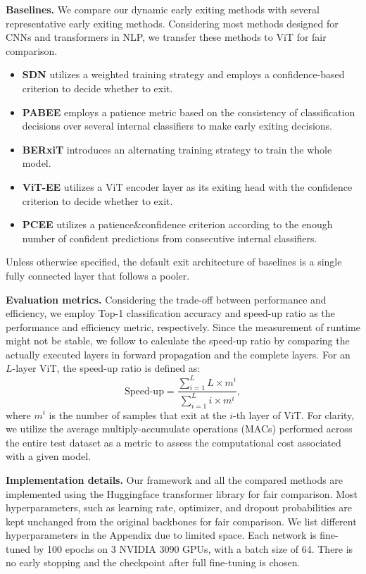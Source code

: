 \noindent
\textbf{Baselines.}
We compare our dynamic early exiting methods with several representative early exiting methods. 
Considering most methods designed for CNNs and transformers in NLP, we transfer these methods to ViT for fair comparison. 
\begin{itemize}
    \item \textbf{SDN} \cite{SDN} utilizes a weighted training strategy and employs a confidence-based criterion to decide whether to exit. 
    \item \textbf{PABEE} \cite{PABEE} employs a patience metric based on the consistency of classification decisions over several internal classifiers to make early exiting decisions. 
    \item \textbf{BERxiT} \cite{BERxiT} introduces an alternating training strategy to train the whole model. 
    \item \textbf{ViT-EE} \cite{ViT-EE} utilizes a ViT encoder layer as its exiting head with the confidence criterion to decide whether to exit. 
    \item \textbf{PCEE} \cite{PCEE} utilizes a patience\&confidence criterion according to the enough number of confident predictions from consecutive internal classifiers. 
    
  \end{itemize}
Unless otherwise specified, the default exit architecture of baselines is a single fully connected layer that follows a pooler.

\noindent
\textbf{Evaluation metrics.}
Considering the trade-off between performance and efficiency, we employ Top-1 classification accuracy and speed-up ratio as the performance and efficiency metric, respectively. 
Since the measurement of runtime might not be stable, we follow \cite{deebert} to calculate the speed-up ratio by comparing the actually executed layers in forward propagation and the complete layers. 
For an $L$-layer ViT, the speed-up ratio is defined as:
\begin{equation}
  \text{Speed-up}=\frac{\sum_{i = 1}^{L}L\times m^i  }{\sum_{i = 1}^{L}i\times m^i}, 
\end{equation}
where $m^i$ is the number of samples that exit at the $i$-th layer of ViT. 
For clarity, we utilize the average multiply-accumulate operations (MACs) performed across the entire test dataset as a metric to assess the computational cost associated with a given model.


\noindent
\textbf{Implementation details.}
Our framework and all the compared methods are implemented using the Huggingface transformer library \cite{huggingface} for fair comparison. 
Most hyperparameters, such as learning rate, optimizer, and dropout probabilities are kept unchanged from the original backbones for fair comparison. 
We list different hyperparameters in the Appendix due to limited space. 
Each network is fine-tuned by 100 epochs on 3 NVIDIA 3090 GPUs, with a batch size of 64. 
There is no early stopping and the checkpoint after full fine-tuning is chosen. 


